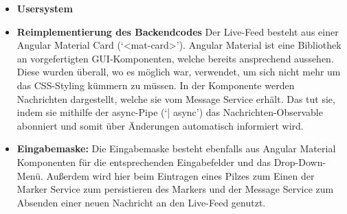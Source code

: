 \documentclass[../main.tex]{subfiles}
\begin{document}
\begin{itemize}
    \item \textbf{Usersystem}
        

  \item \textbf{Reimplementierung des Backendcodes}
        Der Live-Feed besteht aus einer Angular Material Card (`<mat-card>'). Angular Material ist eine Bibliothek an vorgefertigten GUI-Komponenten,
        welche bereits ansprechend aussehen. Diese wurden überall, wo es möglich war, verwendet, um sich nicht mehr um das CSS-Styling kümmern zu müssen.
        In der Komponente werden Nachrichten dargestellt, welche sie vom Message Service erhält. Das tut sie, indem sie mithilfe der async-Pipe (`| async') 
        das Nachrichten-Observable abonniert und somit über Änderungen automatisch informiert wird. 

  \item \textbf{Eingabemaske:}
        Die Eingabemaske besteht ebenfalls aus Angular Material Komponenten für die entsprechenden Eingabefelder und das Drop-Down-Menü. Außerdem wird
        hier beim Eintragen eines Pilzes zum Einen der Marker Service zum persistieren des Markers und der Message Service zum Absenden einer neuen 
        Nachricht an den Live-Feed genutzt.

\end{itemize}
\end{document}
